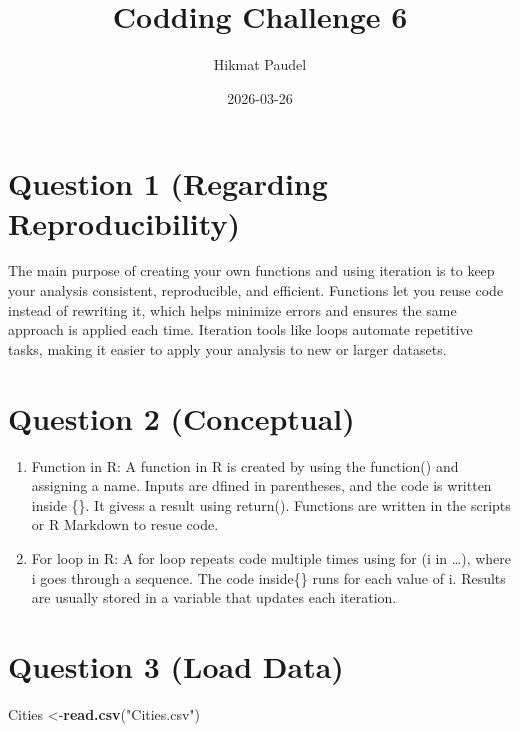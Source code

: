 \documentclass[
]{article}
\title{Codding Challenge 6}
\author{Hikmat Paudel}
\date{2026-03-26}
\newenvironment{Shaded}{\begin{snugshade}}{\end{snugshade}}
\newcommand{\FunctionTok}[1]{\textcolor[rgb]{0.13,0.29,0.53}{\textbf{#1}}}
\newcommand{\NormalTok}[1]{#1}
\newcommand{\OtherTok}[1]{\textcolor[rgb]{0.56,0.35,0.01}{#1}}
\newcommand{\StringTok}[1]{\textcolor[rgb]{0.31,0.60,0.02}{#1}}
\begin{document}
\maketitle

{
\setcounter{tocdepth}{2}
\tableofcontents
}
\section{Question 1 (Regarding
Reproducibility)}\label{question-1-regarding-reproducibility}

The main purpose of creating your own functions and using iteration is
to keep your analysis consistent, reproducible, and efficient. Functions
let you reuse code instead of rewriting it, which helps minimize errors
and ensures the same approach is applied each time. Iteration tools like
loops automate repetitive tasks, making it easier to apply your analysis
to new or larger datasets.

\section{Question 2 (Conceptual)}\label{question-2-conceptual}

\begin{enumerate}
\def\labelenumi{\arabic{enumi})}
\item
  Function in R: A function in R is created by using the function() and
  assigning a name. Inputs are dfined in parentheses, and the code is
  written inside \{\}. It givess a result using return(). Functions are
  written in the scripts or R Markdown to resue code.
\item
  For loop in R: A for loop repeats code multiple times using for (i in
  \ldots), where i goes through a sequence. The code inside\{\} runs for
  each value of i. Results are usually stored in a variable that updates
  each iteration.
\end{enumerate}

\section{Question 3 (Load Data)}\label{question-3-load-data}

\begin{Shaded}
\begin{Highlighting}[]
\NormalTok{Cities }\OtherTok{\textless{}{-}}\FunctionTok{read.csv}\NormalTok{(}\StringTok{"Cities.csv"}\NormalTok{)}
\end{Highlighting}
\end{Shaded}
\end{document}
